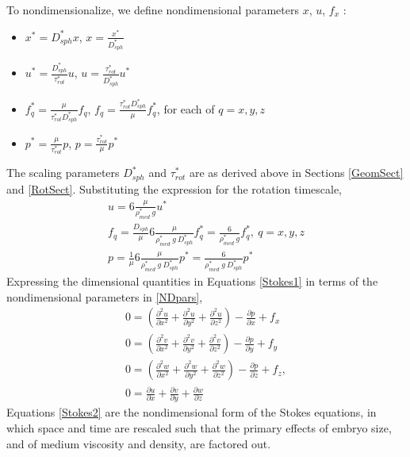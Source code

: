 \documentclass[10pt,a4paper]{article}
\def\non{\nonumber}
\def\p{\partial}
\begin{document}
To nondimensionalize, we define nondimensional parameters $x$, $u$, $f_x$ :
\begin{itemize}
	\item $x^* = D_{sph}^* x$, $x = \frac{x^*}{D_{sph}^*}$
	\item $u^* = \frac{D_{sph}^*}{\tau_{rot}^*} u$, $u = \frac{\tau_{rot}^*}{D_{sph}^*} u^*$
	\item $f_q^* = \frac{\mu}{\tau_{rot}^* D_{sph}^*} f_q$, $f_q = \frac{\tau_{rot}^* D_{sph}^*}{\mu} f_q^*$, for each of $q = x, y, z$
	\item $p^* = \frac{\mu}{\tau_{rot}^*} p$, $p = \frac{\tau_{rot}^*}{\mu} p^*$
\end{itemize}
The scaling parameters $D_{sph}^*$ and $\tau_{rot}^*$ are as derived above in Sections \ref{GeomSect} and \ref{RotSect}.
Substituting the expression for the rotation timescale,
\begin{eqnarray}\label{NDpars}
	u = 6 \frac{\mu}{\rho^*_{med} ~ g } u^* \non \\
	f_q = \frac{D_{sph}}{\mu} 6 \frac{\mu}{\rho^*_{med} ~ g ~ D_{sph}^*} f_q^* = \frac{6}{\rho^*_{med}~  g} f_q^*, ~ q = x, y, z \non \\
	p = \frac{1}{\mu} 6 \frac{\mu}{\rho^*_{med} ~ g ~ D_{sph}^*} p^* = \frac{6}{\rho^*_{med} ~ g ~ D_{sph}^*} p^*
\end{eqnarray}
Expressing the dimensional quantities in Equations \ref{Stokes1} in terms of the nondimensional parameters in \ref{NDpars}, 
\begin{eqnarray}\label{Stokes2}
	0 = \left( \frac{\p^2 u}{\p x^2}+\frac{\p^2 u}{\p y^2}+\frac{\p^2 u}{\p z^2} \right) - \frac{\p p}{\p x} + f_x \non \\
	0 = \left( \frac{\p^2 v}{\p x^2}+\frac{\p^2 v}{\p y^2}+\frac{\p^2 v}{\p z^2} \right) - \frac{\p p}{\p y} + f_y \non \\
	0 = \left( \frac{\p^2 w}{\p x^2}+\frac{\p^2 w}{\p y^2}+\frac{\p^2 w}{\p z^2} \right) - \frac{\p p}{\p z} + f_z , \non \\
	0 =  \frac{\p u}{\p {x}}+\frac{\p v}{\p {y}}+\frac{\p w}{\p {z}}
\end{eqnarray}
Equations \ref{Stokes2} are the nondimensional form of the Stokes equations, in which space and time are rescaled such that the primary effects of embryo size, and of medium viscosity and density, are factored out.  
\end{document}

